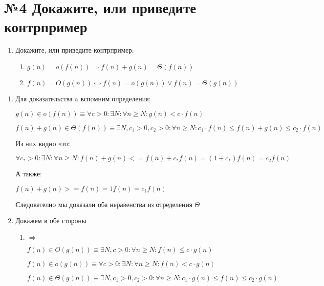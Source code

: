 
\section*{№4 Докажите, или приведите контрпример}
\begin{enumerate}
\item
Докажите, или приведите контрпример:
\begin{enumerate}
  \item $g(n) = o(f(n)) \Rightarrow f(n) + g(n) = \Theta(f(n))$
  \item $f(n) = O(g(n)) \Leftrightarrow f(n) = o(g(n)) \lor f(n) = \Theta(g(n))$
\end{enumerate}
\end{enumerate}
\begin{enumerate}
\item Для доказательства a вспомним определения:

$g(n) \in o(f(n))      \equiv \forall c > 0 : \exists N : \forall n \ge N : g(n) < c \cdot f(n)$

$f(n)+g(n) \in \Theta(f(n)) \equiv \exists N, c_1 > 0, c_2 > 0 : \forall n \ge N : c_1 \cdot f(n) \le f(n)+g(n) \le c_2 \cdot f(n)$


Из них видно что:

$\forall c_* > 0 : \exists N :\forall n \ge N :f(n)+g(n)<= f(n)+c_*f(n)= (1+c_*)f(n) =c_2f(n)$


А также:

$f(n)+g(n)>=f(n)=1f(n)=c_1f(n)$

Следователно мы доказали оба неравенства из отределения $\Theta$


  

\item Докажем в обе стороны
\begin{enumerate}
\item $\Rightarrow$

$f(n) \in O(g(n))     \equiv \exists N, c > 0 : \forall n \ge N : f(n) \le c \cdot g(n)$

$f(n) \in o(g(n))      \equiv \forall c > 0 : \exists N : \forall n \ge N : f(n) < c \cdot g(n)$

$f(n) \in \Theta(g(n)) \equiv \exists N, c_1 > 0, c_2 > 0 : \forall n \ge N : c_1 \cdot g(n) \le f(n) \le c_2 \cdot g(n)$

\end{enumerate}
\end{enumerate}